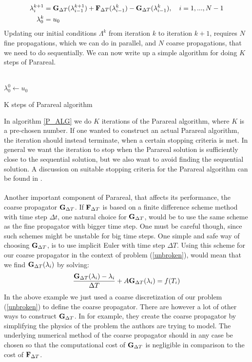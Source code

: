 \begin{align}
\lambda_{i}^{k+1} &= \bold G_ {\Delta T}(\lambda_{i-1}^{k+1})+\bold F_ {\Delta T}( \lambda_{i-1}^{k})-\bold G_ {\Delta T}( \lambda_{i-1}^{k}), \quad i=1,...,N-1 \label{pred_corr_PR} \\
\lambda_0^k &= u_0
\end{align}
Updating our initial conditions $\Lambda^k$ from iteration $k$ to iteration $k+1$, requires $N$ fine propagations, which we can do in parallel, and $N$ coarse propagations, that we need to do sequentially. We can now write up a simple algorithm for doing $K$ steps of Parareal.
\\
\\
\begin{algorithm}[H]
$\lambda^0_0\leftarrow u_0$\;
\caption{K steps of Parareal algorithm\label{P_ALG}}
\end{algorithm}
\noindent
In algorithm \ref{P_ALG} we do $K$ iterations of the Parareal algorithm, where $K$ is a pre-chosen number. If one wanted to construct an actual Parareal algorithm, the iteration should instead terminate, when a certain stopping criteria is met. In general we want the iteration to stop when the Parareal solution is sufficiently close to the sequential solution, but we also want to avoid finding the sequential solution. A discussion on suitable stopping criteria for the Parareal algorithm can be found in \cite{lepsa2010efficient}.
\\
\\
Another important component of Parareal, that affects its performance, the coarse propagator $\bold G_{\Delta T}$. If $\bold F_{\Delta T}$ is based on a finite difference scheme method with time step $\Delta t$, one natural choice for $\bold G_{\Delta T}$, would be to use the same scheme as the fine propagator with bigger time step. One must be careful though, since such schemes might be unstable for big time steps. One simple and safe way of choosing $\bold G_{\Delta T}$, is to use implicit Euler with time step $\Delta T$. Using this scheme for our coarse propagator in the context of problem (\ref{unbroken}), would mean that we find $\bold{G}_{\Delta T}(\lambda_i)$ by solving:
\begin{align}
\frac{\bold{G}_{\Delta T}(\lambda_i) -\lambda_i }{\Delta T } + A \bold{G}_{\Delta T}(\lambda_i) = f(T_{i}) \label{G_Backward}
\end{align}
In the above example we just used a coarse discretization of our problem (\ref{unbroken}) to define the coarse propagator. There are however a lot of other ways to construct $\bold{G}_{\Delta T}$. In \cite{baffico2002parallel} for example, they create the coarse propagator by simplifying the physics of the problem the authors are trying to model. The underlying numerical method of the coarse propagator should in any case be chosen so that the computational cost of $\bold{G}_{\Delta T}$ is negligible in comparison to the cost of  $\bold{F}_{\Delta T}$.

